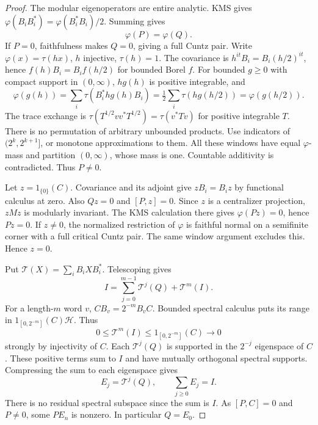 \begin{proof}
The modular eigenoperators are entire analytic. KMS gives
$\varphi(B_iB_i^*)=\varphi(B_i^*B_i)/2$. Summing gives
\begin{equation}\label{eq:defectmass}
 \varphi(P)=\varphi(Q).
\end{equation}
If $P=0$, faithfulness makes $Q=0$, giving a full Cuntz pair.
Write $\varphi(x)=\tau(hx)$, $h$ injective, $\tau(h)=1$.
The covariance is $h^{it}B_i=B_i(h/2)^{it}$, hence
$f(h)B_i=B_if(h/2)$ for bounded Borel $f$.
For bounded $g\geq0$ with compact support in $(0,\infty)$,
$hg(h)$ is positive integrable, and
\[
 \varphi(g(h))=\sum_i\tau(B_i^*hg(h)B_i)
 =\tfrac12\sum_i\tau(hg(h/2))=\varphi(g(h/2)).
\]
The trace exchange is
$\tau(T^{1/2}vv^*T^{1/2})=\tau(v^*Tv)$ for positive integrable $T$.
There is no permutation of arbitrary unbounded products.
Use indicators of $(2^k,2^{k+1}]$, or monotone approximations to them.
All these windows have equal $\varphi$-mass and partition $(0,\infty)$,
whose mass is one. Countable additivity is contradicted. Thus $P\ne0$.

Let $z=1_{\{0\}}(C)$. Covariance and its adjoint give
$zB_i=B_iz$ by functional calculus at zero. Also $Qz=0$ and $[P,z]=0$.
Since $z$ is a centralizer projection, $zMz$ is modularly invariant.
The KMS calculation there gives $\varphi(Pz)=0$, hence $Pz=0$.
If $z\ne0$, the normalized restriction of $\varphi$ is faithful normal
on a semifinite corner with a full critical Cuntz pair. The same window
argument excludes this. Hence $z=0$.

Put $\mathcal T(X)=\sum_iB_iXB_i^*$. Telescoping gives
\begin{equation}\label{eq:telescope}
 I=\sum_{j=0}^{m-1}\mathcal T^j(Q)+\mathcal T^m(I).
\end{equation}
For a length-$m$ word $v$, $CB_v=2^{-m}B_vC$. Bounded spectral calculus
puts its range in $1_{[0,2^{-m}]}(C)\mathcal H$. Thus
\[
 0\leq\mathcal T^m(I)\leq1_{[0,2^{-m}]}(C)\longrightarrow0
\]
strongly by injectivity of $C$. Each $\mathcal T^j(Q)$ is supported
in the $2^{-j}$ eigenspace of $C$. These positive terms sum to $I$
and have mutually orthogonal spectral supports. Compressing the sum
to each eigenspace gives
\begin{equation}\label{eq:En}
 E_j=\mathcal T^j(Q),\qquad \sum_{j\geq0}E_j=I.
\end{equation}
There is no residual spectral subspace since the sum is $I$.
As $[P,C]=0$ and $P\ne0$, some $PE_n$ is nonzero. In particular $Q=E_0$.
\end{proof}

